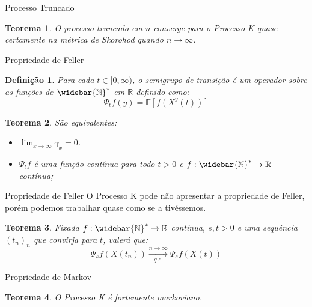\documentclass[xcolor=pdftex,dvipsnames]{beamer}
\newcommand{\Nzb}{{\mathbb{\widebar{N}^*}}}
\newcommand{\R}{{\mathbb{R}}}
\newcommand{\E}{{\mathbb{E}}}
\newtheorem{teorema}{Teorema}
\newtheorem{definicao}{Definição}
\begin{document}
\begin{frame}{Processo Truncado}
  \begin{teorema}
    O processo truncado em $n$ converge para o Processo K quase
    certamente na métrica de Skorohod quando $n \to \infty$.
  \end{teorema}
\end{frame}


\begin{frame}{Propriedade de Feller}

  \begin{definicao}
    Para cada $t \in [0, \infty)$, o semigrupo de transição é um
    operador sobre as funções de $\Nzb$ em $\R$ definido como:
    \begin{displaymath}
      \Psi_t f (y) = \E \left[ f(X^y(t)) \right]
    \end{displaymath}
  \end{definicao} \pause

  \begin{teorema}
    São equivalentes:
    \begin{itemize}
    \item $\displaystyle \lim_{x \to \infty} \gamma_x = 0$.
    \item $\Psi_t f$ é uma função contínua para todo $t > 0$ e $f:
      \Nzb \to \R$ contínua;
    \end{itemize}
  \end{teorema}
\end{frame}

\begin{frame}{Propriedade de Feller}
  O Processo K pode não apresentar a propriedade de Feller, porém
  podemos trabalhar quase como se a tivéssemos.
  \begin{teorema}
    Fixada $f: \Nzb \to \R$ contínua, $s, t > 0$ e uma sequência
    $(t_n)_n$ que convirja para $t$, valerá que:
    \begin{displaymath}
      \Psi_s f (X(t_n)) \xrightarrow[q.c.]{n \to \infty} \Psi_s f (X(t))
    \end{displaymath}
  \end{teorema}
\end{frame}

\begin{frame}{Propriedade de Markov}
  \begin{teorema}
    O Processo K é fortemente markoviano.
  \end{teorema}
\end{frame}
\end{document}
